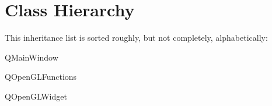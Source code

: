 \section{Class Hierarchy}
This inheritance list is sorted roughly, but not completely, alphabetically\+:\begin{DoxyCompactList}
\item {}
\item Q\+Main\+Window\begin{DoxyCompactList}
\item {}
\end{DoxyCompactList}
\item Q\+Open\+G\+L\+Functions\begin{DoxyCompactList}
\item {}
\end{DoxyCompactList}
\item Q\+Open\+G\+L\+Widget\begin{DoxyCompactList}
\item {}
\end{DoxyCompactList}
\item {}
\item {}
\end{DoxyCompactList}
